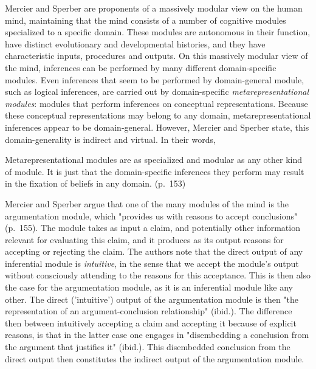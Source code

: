 Mercier and Sperber are proponents of a massively modular view on the human mind, maintaining that the mind consists of a number of cognitive modules specialized to a specific domain. These modules are autonomous in their function, have distinct evolutionary and developmental histories, and they have characteristic inputs, procedures and outputs.
On this massively modular view of the mind, inferences can be performed by many different domain-specific modules. Even inferences that seem to be performed by domain-general module, such as logical inferences, are carried out by domain-specific \emph{metarepresentational modules}: modules that perform inferences on conceptual representations.
Because these conceptual representations may belong to any domain, metarepresentational inferences appear to be domain-general. However, Mercier and Sperber state, this domain-generality is indirect and virtual. In their words,
\begin{quoting}
    Metarepresentational modules are as specialized and modular as any other kind of module. It is just that the domain-specific inferences they perform may result in the fixation of beliefs in any domain.
    \hfill (p.~153)
\end{quoting}

Mercier and Sperber argue that one of the many modules of the mind is the argumentation module, which "provides us with reasons to accept conclusions" (p.~155). The module takes as input a claim, and potentially other information relevant for evaluating this claim, and it produces as its output reasons for accepting or rejecting the claim.
The authors note that the direct output of any inferential module is \emph{intuitive}, in the sense that we accept the module's output without consciously attending to the reasons for this acceptance. This is then also the case for the argumentation module, as it is an inferential module like any other. The direct ('intuitive') output of the argumentation module is then "the representation of an argument-conclusion relationship" (ibid.).
The difference then between intuitively accepting a claim and accepting it because of explicit reasons, is that in the latter case one engages in "disembedding a conclusion from the argument that justifies it" (ibid.).
This disembedded conclusion from the direct output then constitutes the indirect output of the argumentation module.

